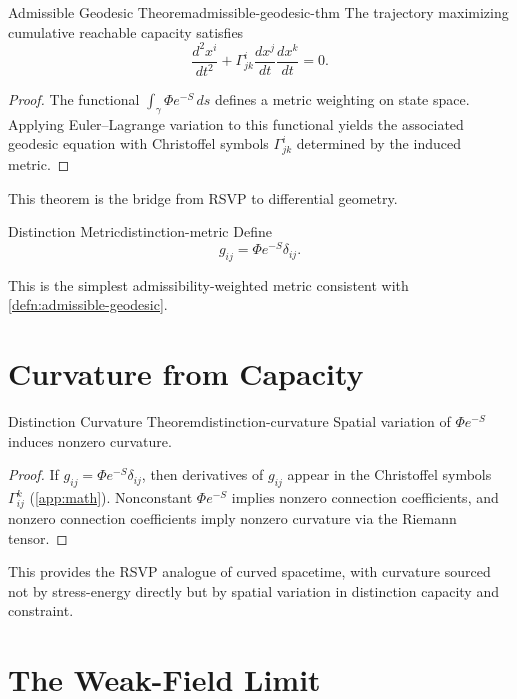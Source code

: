 \documentclass[12pt,twoside,openright]{book}
\begin{document}
\begin{theorem}{Admissible Geodesic Theorem}{admissible-geodesic-thm}
  The trajectory maximizing cumulative reachable capacity
  satisfies
  \[
    \frac{d^2 x^i}{dt^2}
    + \Gamma^i_{jk}\frac{dx^j}{dt}\frac{dx^k}{dt} = 0.
  \]
\end{theorem}

\begin{proof}
  The functional $\int_\gamma \Phi e^{-S}\,ds$ defines a
  metric weighting on state space. Applying Euler--Lagrange
  variation to this functional yields the associated
  geodesic equation with Christoffel symbols
  $\Gamma^i_{jk}$ determined by the induced metric.
\end{proof}

This theorem is the bridge from RSVP to differential
geometry.

\begin{definition}{Distinction Metric}{distinction-metric}
  Define
  \[
    g_{ij} = \Phi e^{-S} \delta_{ij}.
  \]
\end{definition}

This is the simplest admissibility-weighted metric
consistent with \cref{defn:admissible-geodesic}.

\section{Curvature from Capacity}
\label{sec:ch17-curvature}

\begin{theorem}{Distinction Curvature Theorem}{distinction-curvature}
  Spatial variation of $\Phi e^{-S}$ induces nonzero
  curvature.
\end{theorem}

\begin{proof}
  If $g_{ij} = \Phi e^{-S}\delta_{ij}$, then derivatives of
  $g_{ij}$ appear in the Christoffel symbols
  $\Gamma^k_{ij}$ (\cref{app:math}). Nonconstant
  $\Phi e^{-S}$ implies nonzero connection coefficients,
  and nonzero connection coefficients imply nonzero
  curvature via the Riemann tensor.
\end{proof}

This provides the RSVP analogue of curved spacetime, with
curvature sourced not by stress-energy directly but by
spatial variation in distinction capacity and constraint.

\section{The Weak-Field Limit}
\label{sec:ch17-weakfield}
\end{document}
